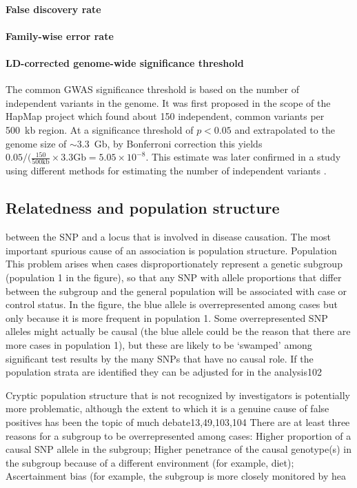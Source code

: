 \paragraph{False discovery rate}

\paragraph{Family-wise error rate}

\paragraph{LD-corrected genome-wide significance threshold}
The common GWAS significance threshold is based on the number of independent variants in the genome. It was first proposed in the scope of the HapMap project \citeyear{HapMap2005} which found about \num{150} independent, common variants per \num{500}~kb region. At a significance threshold of \(p < 0.05\) and extrapolated to the genome size of \(\sim 3.3\)~Gb, by Bonferroni correction this yields  \(0.05/(\frac{150}{500\text{kb}} \times 3.3 \text{Gb}= 5.05 \times 10^{-8}\). This estimate was later confirmed in a study using different methods for estimating the number of independent variants \citep{Fadista2016}.

\subsection{Relatedness and population structure}
between the SNP and a locus that is involved in disease causation. The most important spurious cause of an association is population structure.
Population
This problem arises when
cases disproportionately represent a genetic subgroup (population 1 in the figure), so that any SNP with allele proportions that differ between the subgroup and the general population will be associated with case or control status. In the figure, the blue allele is overrepresented among cases but only because it is more frequent in population 1. Some overrepresented SNP alleles might actually be causal (the blue allele could be
the reason that there are more cases in population 1), but these are likely to be ‘swamped’ among significant test results by the many SNPs that have no causal role. If the population strata are identified they can be adjusted for in the analysis102

Cryptic population structure that is not recognized by investigators is potentially
more problematic, although the extent to which it is a genuine cause of false positives has been the topic of much debate13,49,103,104
There are at least three reasons for a
subgroup to be overrepresented among cases: Higher proportion of a causal SNP allele in the subgroup;
Higher penetrance of the causal genotype(s) in the subgroup because of a different environment (for example, diet);
Ascertainment bias (for example, the subgroup is more closely monitored by hea




